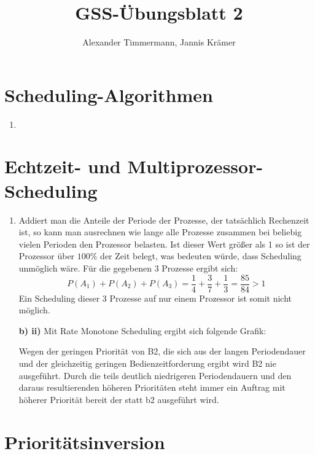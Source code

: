 \documentclass[a4paper,11pt]{scrartcl}
\author{Alexander Timmermann, Jannis Krämer}
\title{GSS-Übungsblatt 2}
\date{}
\begin{document}
\maketitle
\thispagestyle{empty}

\doublespace

\section{Scheduling-Algorithmen}

\begin{enumerate}[\bf a)]
    \item
\end{enumerate}

\section{Echtzeit- und Multiprozessor-Scheduling}

\begin{enumerate}[\bf a)]
    \item Addiert man die Anteile der Periode der Prozesse, der tatsächlich Rechenzeit ist, so kann man ausrechnen wie lange alle Prozesse zusammen bei beliebig vielen Perioden den Prozessor belasten. Ist dieser Wert größer als 1 so ist der Prozessor über $100\%$ der Zeit belegt, was bedeuten würde, dass Scheduling unmöglich wäre. Für die gegebenen 3 Prozesse ergibt sich:
    \begin{displaymath}
        P(A_1) + P(A_2) + P(A_3) = \frac{1}{4} + \frac{3}{7} + \frac{1}{3} = \frac{85}{84} > 1
    \end{displaymath}
    Ein Scheduling dieser 3 Prozesse auf nur einem Prozessor ist somit nicht möglich. 
    
    \item[\textbf{b) ii)}] Mit Rate Monotone Scheduling ergibt sich folgende Grafik:
    \begin{center}
        \scalebox{0.4}{}
    \end{center}
    Wegen der geringen Priorität von B2, die sich aus der langen Periodendauer und der gleichzeitig geringen Bedienzeitforderung ergibt wird B2 nie ausgeführt. Durch die teils deutlich niedrigeren Periodendauern und den daraus resultierenden höheren Prioritäten steht immer ein Auftrag mit höherer Priorität bereit der statt b2 ausgeführt wird.
\end{enumerate}

\section{Prioritätsinversion}
\end{document}
